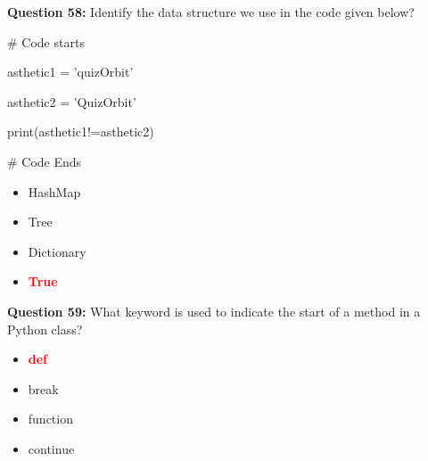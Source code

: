 \documentclass[12pt,a4paper]{article}
\begin{document}
\vspace{0.5cm}

\textbf{Question 58:} Identify the data structure we use in the code given below?\newline

\newline
# Code starts\newline

\newline
\newline

\newline
asthetic1 = 'quizOrbit'\newline

\newline
asthetic2 = 'QuizOrbit'\newline

\newline
\newline

\newline
print(asthetic1!=asthetic2)\newline

\newline
\newline

\newline
# Code Ends

\begin{itemize}
    \item[\textbf{A.}] HashMap
    \item[\textbf{B.}] Tree
    \item[\textbf{C.}] Dictionary
    \item[\textbf{D.}] \textcolor{red}{\textbf{True}}
\end{itemize}

\vspace{0.5cm}

\textbf{Question 59:} What keyword is used to indicate the start of a method in a Python class?

\begin{itemize}
    \item[\textbf{A.}] \textcolor{red}{\textbf{def}}
    \item[\textbf{B.}] break
    \item[\textbf{C.}] function
    \item[\textbf{D.}] continue
\end{itemize}

\vspace{0.5cm}
\end{document}
